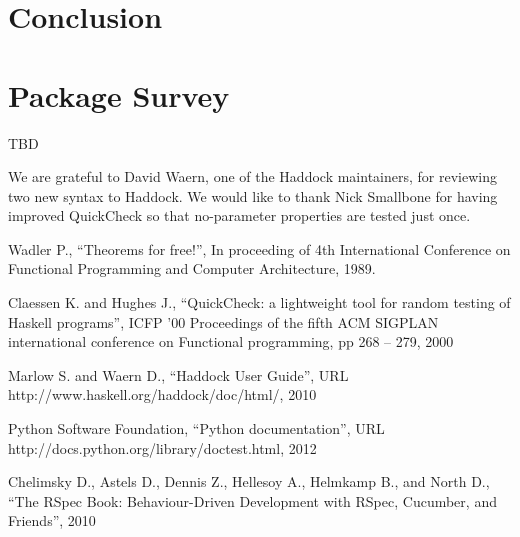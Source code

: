 \documentclass[preprint]{sigplanconf}
\begin{document}
\section{Conclusion}

\appendix

\section{Package Survey}

TBD

\acks

We are grateful to David Waern, 
one of the Haddock maintainers, 
for reviewing two new syntax to Haddock.
We would like to thank
Nick Smallbone for having improved QuickCheck so that no-parameter properties are tested just once.






\begin{thebibliography}{}
\softraggedright

Wadler P.,
``Theorems for free!'',
In proceeding of 4th International Conference on Functional Programming and Computer Architecture, 1989.

Claessen K. and Hughes J.,
``QuickCheck: a lightweight tool for random testing of Haskell programs'',
ICFP '00 Proceedings of the fifth ACM SIGPLAN international conference on Functional programming,
pp 268 -- 279,
2000

Marlow S. and Waern D.,
``Haddock User Guide'',
URL http://www.haskell.org/haddock/doc/html/,
2010

Python Software Foundation,
``Python documentation'',
URL http://docs.python.org/library/doctest.html,
2012

Chelimsky D.,
Astels D., Dennis Z., Hellesoy A., Helmkamp B., and North D.,
``The RSpec Book: Behaviour-Driven
Development with RSpec, Cucumber, and Friends'',
2010

\end{thebibliography}
\end{document}
